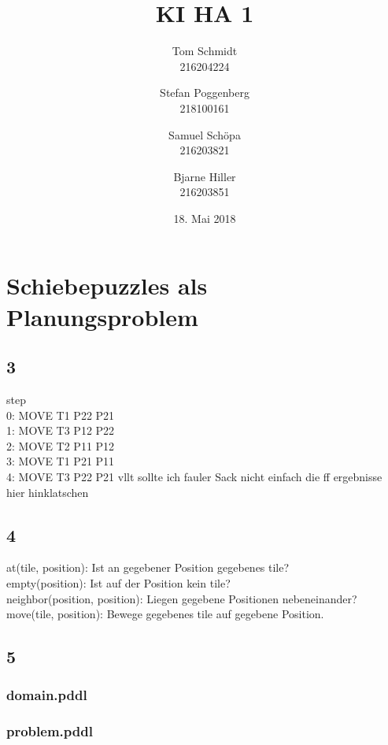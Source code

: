 \documentclass[fleqn]{scrartcl}
\author{Tom Schmidt\\216204224 \and Stefan Poggenberg\\218100161 \and Samuel Schöpa\\216203821 \and Bjarne Hiller\\216203851}
\title{KI HA 1}
\date{18. Mai 2018}
\begin{document}
\maketitle
\section{Schiebepuzzles als Planungsproblem}
\subsection{3}
step \\
        0: MOVE T1 P22 P21 \\
        1: MOVE T3 P12 P22 \\
        2: MOVE T2 P11 P12 \\
        3: MOVE T1 P21 P11 \\
        4: MOVE T3 P22 P21 vllt sollte ich fauler Sack nicht einfach die ff ergebnisse hier hinklatschen
\subsection{4}
  at(tile, position): Ist an gegebener Position gegebenes tile? \\
  empty(position): Ist auf der Position kein tile? \\
  neighbor(position, position): Liegen gegebene Positionen nebeneinander? \\
  move(tile, position): Bewege gegebenes tile auf gegebene Position. \\
\subsection{5}
\subsubsection{domain.pddl}

\subsubsection{problem.pddl}

\end{document}
